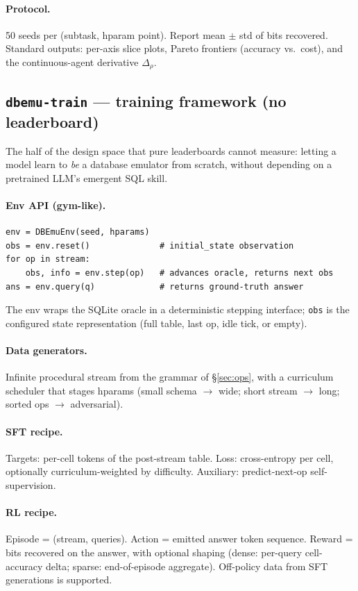 \documentclass[11pt]{article}
\begin{document}
\paragraph{Protocol.}
50 seeds per (subtask, hparam point). Report mean $\pm$ std of bits
recovered. Standard outputs: per-axis slice plots, Pareto frontiers
(accuracy vs.\ cost), and the continuous-agent derivative
$\Delta_\rho$.

\subsection{\texttt{dbemu-train} --- training framework (no leaderboard)}

The half of the design space that pure leaderboards cannot measure:
letting a model learn to \emph{be} a database emulator from scratch,
without depending on a pretrained LLM's emergent SQL skill.

\paragraph{Env API (gym-like).}
\begin{lstlisting}
env = DBEmuEnv(seed, hparams)
obs = env.reset()              # initial_state observation
for op in stream:
    obs, info = env.step(op)   # advances oracle, returns next obs
ans = env.query(q)             # returns ground-truth answer
\end{lstlisting}
The env wraps the SQLite oracle in a deterministic stepping interface;
\texttt{obs} is the configured state representation (full table, last
op, idle tick, or empty).

\paragraph{Data generators.}
Infinite procedural stream from the grammar of \S\ref{sec:ops}, with a
curriculum scheduler that stages hparams (small schema $\to$ wide;
short stream $\to$ long; sorted ops $\to$ adversarial).

\paragraph{SFT recipe.}
Targets: per-cell tokens of the post-stream table. Loss:
cross-entropy per cell, optionally curriculum-weighted by difficulty.
Auxiliary: predict-next-op self-supervision.

\paragraph{RL recipe.}
Episode = (stream, queries). Action = emitted answer token sequence.
Reward = bits recovered on the answer, with optional shaping (dense:
per-query cell-accuracy delta; sparse: end-of-episode aggregate).
Off-policy data from SFT generations is supported.
\end{document}

